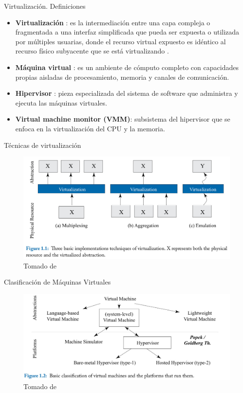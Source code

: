\documentclass[11pt]{beamer}
\begin{document}
\begin{frame}{Virtualización. Definiciones \citep{bugnion2017hardware}}
	\begin{itemize}
		\item \textbf{Virtualización} : es la intermediación entre una capa compleja o fragmentada a una interfaz simplificada que pueda ser expuesta o utilizada por múltiples usuarias, donde el recurso virtual expuesto es idéntico al recurso físico subyacente que se está virtualizando \citep{bugnion2017hardware,ward2021linux}.
		\item \textbf{Máquina virtual} :  es un ambiente de cómputo completo con capacidades propias aisladas de procesamiento, memoria y canales de comunicación.
		\item \textbf{Hipervisor} : pieza especializada del sistema de software que administra y ejecuta las máquinas virtuales.
		\item \textbf{Virtual machine monitor (VMM)}: subsistema del hipervisor que se enfoca en la virtualización del CPU y la memoria.
	\end{itemize}
\end{frame}


\begin{frame}{Técnicas de virtualización}

  \begin{figure}
  	\includegraphics[scale=1.0]{images/tecnicas_virtualizacion}
  	\caption{Tomado de \cite{bugnion2017hardware}}
  \end{figure}

\end{frame}


\begin{frame}{Clasificación de Máquinas Virtuales}
  \begin{figure}
  	\includegraphics[scale=1.1]{images/vm_clasificacion}
  	\caption{Tomado de \cite{bugnion2017hardware}}
  \end{figure}
\end{frame}
\end{document}
